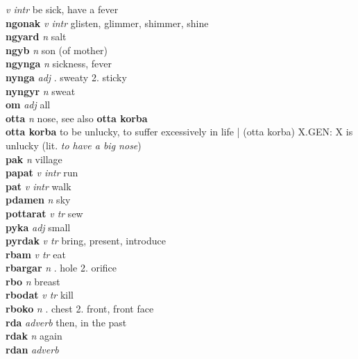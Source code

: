  \emph{v intr} \textperiodcentered be sick, have a fever\\\textbf{ngonak}   \emph{v intr} \textperiodcentered glisten, glimmer, shimmer, shine\\\textbf{ngyard}   \emph{n} \textperiodcentered salt\\\textbf{ngyb}   \emph{n} \textperiodcentered son (of mother)\\\textbf{ngynga}   \emph{n} \textperiodcentered sickness, fever\\\textbf{nynga}   \emph{adj} . sweaty 2. sticky \\\textbf{nyngyr}   \emph{n} \textperiodcentered sweat\\\textbf{om}   \emph{adj} \textperiodcentered all\\\textbf{otta}   \emph{n} \textperiodcentered nose, see also \textbf{otta korba}\\\textbf{otta korba}    \textperiodcentered to be unlucky, to suffer excessively in life | (otta korba) X.GEN: X is unlucky (lit. \emph{to have a big nose})\\\textbf{pak}   \emph{n} \textperiodcentered village\\\textbf{papat}   \emph{v intr} \textperiodcentered run\\\textbf{pat}   \emph{v intr} \textperiodcentered walk\\\textbf{pdamen}   \emph{n} \textperiodcentered sky\\\textbf{pottarat}   \emph{v tr} \textperiodcentered sew\\\textbf{pyka}   \emph{adj} \textperiodcentered small\\\textbf{pyrdak}   \emph{v tr} \textperiodcentered bring, present, introduce\\\textbf{rbam}   \emph{v tr} \textperiodcentered eat\\\textbf{rbargar}   \emph{n} . hole 2. orifice \\\textbf{rbo}   \emph{n} \textperiodcentered breast\\\textbf{rbodat}   \emph{v tr} \textperiodcentered kill\\\textbf{rboko}   \emph{n} . chest 2. front, front face \\\textbf{rda}   \emph{adverb} \textperiodcentered then, in the past\\\textbf{rdak}   \emph{n} \textperiodcentered again\\\textbf{rdan}   \emph{adverb} \textperiodcentered 